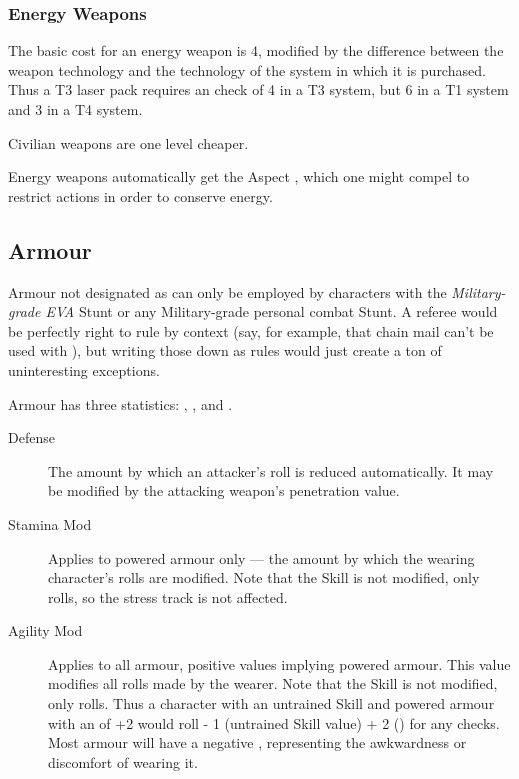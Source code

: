 \subsubsection{Energy Weapons}
\label{sec:personal-combat-energy-weapons}



The basic cost for an energy weapon is 4, modified by the difference between the weapon technology and the technology of the system in which it is purchased. Thus a T3 laser pack requires an  check of 4 in a T3 system, but 6 in a T1 system and 3 in a T4 system.

Civilian weapons are one level cheaper.

Energy weapons automatically get the Aspect , which one might compel to restrict actions in order to conserve energy.

\subsection{Armour}\label{sec:personal-combat-armour}

Armour not designated as  can only be employed by characters with the \emph{Military-grade EVA} Stunt or any Military-grade personal combat Stunt. A referee would be perfectly right to rule by context (say, for example, that chain mail can't be used with ), but writing those down as rules would just create a ton of uninteresting exceptions.


Armour has three statistics: , , and .

\begin{description}
\item [Defense]
The amount by which an attacker's roll is reduced automatically. It may be modified by the attacking weapon's penetration value.
\item [Stamina Mod]
Applies to powered armour only --- the amount by which the wearing character's  rolls are modified. Note that the  Skill is not modified, only rolls, so the \Health{} stress track is not affected.
\item [Agility Mod]
Applies to all armour, positive values implying powered armour. This value modifies all  rolls made by the wearer. Note that the  Skill is not modified, only rolls. Thus a character with an untrained  Skill and powered armour with an  of +2 would roll \dF{} - 1 (untrained Skill value) + 2 () for any  checks. Most armour will have a negative , representing the awkwardness or discomfort of wearing it.
\end{description}

